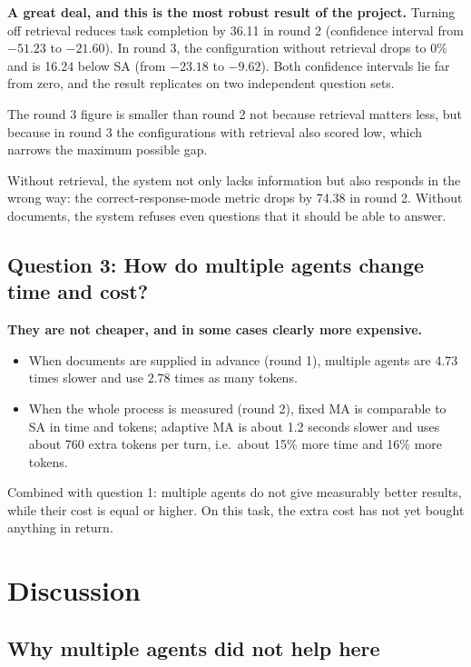\textbf{A great deal, and this is the most robust result of the project.} Turning off retrieval reduces task completion by 36.11 \pp{} in round 2 (confidence interval from $-51.23$ to $-21.60$). In round 3, the configuration without retrieval drops to 0\% and is 16.24 \pp{} below SA (from $-23.18$ to $-9.62$). Both confidence intervals lie far from zero, and the result replicates on two independent question sets.

The round 3 figure is smaller than round 2 not because retrieval matters less, but because in round 3 the configurations with retrieval also scored low, which narrows the maximum possible gap.

Without retrieval, the system not only lacks information but also responds in the wrong way: the correct-response-mode metric drops by 74.38 \pp{} in round 2. Without documents, the system refuses even questions that it should be able to answer.

\subsection{Question 3: How do multiple agents change time and cost?}

\textbf{They are not cheaper, and in some cases clearly more expensive.}

\begin{itemize}
    \item When documents are supplied in advance (round 1), multiple agents are 4.73 times slower and use 2.78 times as many tokens.
    \item When the whole process is measured (round 2), fixed MA is comparable to SA in time and tokens; adaptive MA is about 1.2 seconds slower and uses about 760 extra tokens per turn, i.e.\ about 15\% more time and 16\% more tokens.
\end{itemize}

Combined with question 1: multiple agents do not give measurably better results, while their cost is equal or higher. On this task, the extra cost has not yet bought anything in return.

\section{Discussion}

\subsection{Why multiple agents did not help here}

